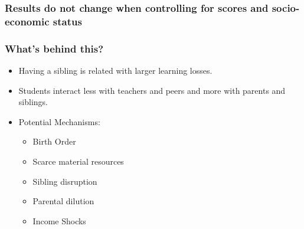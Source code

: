 \documentclass{beamer}
\begin{document}
\begin{frame}
    \label{frame:twfe_gpa_controls_siblings}
    \frametitle{Results do not change when controlling for scores and socio-economic status}
        {
    }

    \begin{flushleft}
        \hyperlink{frame:twfe_gpa_controls}{}
    \end{flushleft}       

\end{frame}



\begin{frame}
    \label{frame:mechanisms}
    \frametitle{What's behind this?}
\begin{itemize}
    \item Having a sibling is related with larger learning losses.
    \item Students interact less with teachers and peers and more with parents and siblings.
    \item Potential Mechanisms:   
    \begin{itemize}
        \item Birth Order
        \item Scarce material resources
        \item Sibling disruption
        \item Parental dilution
        \item Income Shocks
    \end{itemize} 
\end{itemize}
\end{frame}
\end{document}
